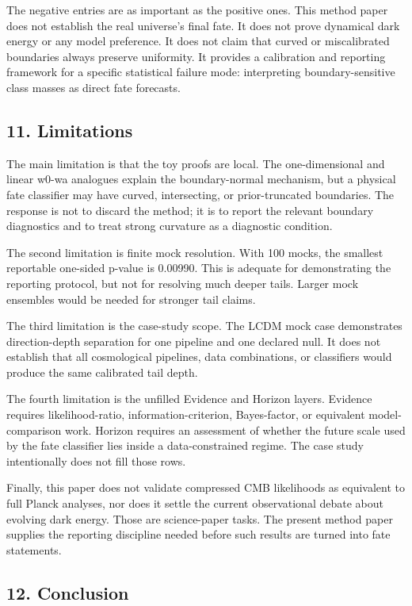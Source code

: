 \documentclass[
]{article}
\begin{document}
The negative entries are as important as the positive ones. This method
paper does not establish the real universe's final fate. It does not
prove dynamical dark energy or any model preference. It does not claim
that curved or miscalibrated boundaries always preserve uniformity. It
provides a calibration and reporting framework for a specific
statistical failure mode: interpreting boundary-sensitive class masses
as direct fate forecasts.

\subsection{11. Limitations}\label{limitations}

The main limitation is that the toy proofs are local. The
one-dimensional and linear w0-wa analogues explain the boundary-normal
mechanism, but a physical fate classifier may have curved, intersecting,
or prior-truncated boundaries. The response is not to discard the
method; it is to report the relevant boundary diagnostics and to treat
strong curvature as a diagnostic condition.

The second limitation is finite mock resolution. With 100 mocks, the
smallest reportable one-sided p-value is 0.00990. This is adequate for
demonstrating the reporting protocol, but not for resolving much deeper
tails. Larger mock ensembles would be needed for stronger tail claims.

The third limitation is the case-study scope. The LCDM mock case
demonstrates direction-depth separation for one pipeline and one
declared null. It does not establish that all cosmological pipelines,
data combinations, or classifiers would produce the same calibrated tail
depth.

The fourth limitation is the unfilled Evidence and Horizon layers.
Evidence requires likelihood-ratio, information-criterion, Bayes-factor,
or equivalent model-comparison work. Horizon requires an assessment of
whether the future scale used by the fate classifier lies inside a
data-constrained regime. The case study intentionally does not fill
those rows.

Finally, this paper does not validate compressed CMB likelihoods as
equivalent to full Planck analyses, nor does it settle the current
observational debate about evolving dark energy. Those are science-paper
tasks. The present method paper supplies the reporting discipline needed
before such results are turned into fate statements.

\subsection{12. Conclusion}\label{conclusion}
\end{document}
